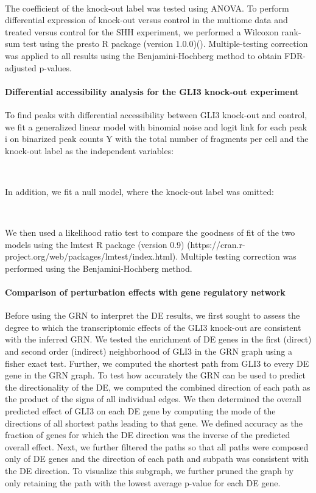             ~
 
The coefficient of the knock-out label was tested using ANOVA. To perform differential expression of knock-out versus control in the multiome data and treated versus control for the SHH experiment, we performed a Wilcoxon rank-sum test using the presto R package (version 1.0.0)(\cite{korsunsky_presto_2019}). Multiple-testing correction was applied to all results using the Benjamini-Hochberg method to obtain FDR-adjusted p-values.
 
 
\paragraph{Differential accessibility analysis for the GLI3 knock-out experiment}
To find peaks with differential accessibility between GLI3 knock-out and control, we fit a generalized linear model with binomial noise and logit link for each peak i on binarized peak counts Y with the total number of fragments per cell and the knock-out label as the independent variables:
 
            ~
 
In addition, we fit a null model, where the knock-out label was omitted:
 
            ~
 
We then used a likelihood ratio test to compare the goodness of fit of the two models using the lmtest R package (version 0.9) (https://cran.r-project.org/web/packages/lmtest/index.html). Multiple testing correction was performed using the Benjamini-Hochberg method.
 
\paragraph{Comparison of perturbation effects with gene regulatory network}
Before using the GRN to interpret the DE results, we first sought to assess the degree to which the transcriptomic effects of the GLI3 knock-out are consistent with the inferred GRN. We tested the enrichment of DE genes in the first (direct) and second order (indirect) neighborhood of GLI3 in the GRN graph using a fisher exact test. Further, we computed the shortest path from GLI3 to every DE gene in the GRN graph. To test how accurately the GRN can be used to predict the directionality of the DE, we computed the combined direction of each path as the product of the signs of all individual edges. We then determined the overall predicted effect of GLI3 on each DE gene by computing the mode of the directions of all shortest paths leading to that gene. We defined accuracy as the fraction of genes for which the DE direction was the inverse of the predicted overall effect. Next, we further filtered the paths so that all paths were composed only of DE genes and the direction of each path and subpath was consistent with the DE direction. To visualize this subgraph, we further pruned the graph by only retaining the path with the lowest average  p-value for each DE gene.
 

